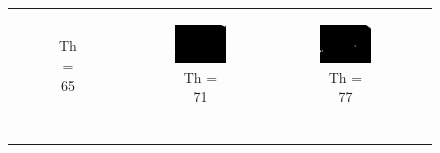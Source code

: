 \begin{figure}[htbp]
\begin{tabular}{cccc}
\begin{subfigure}{0.2\linewidth}
    \caption{Th = 65}
    \end{subfigure} &
    \begin{subfigure}{0.2\linewidth}
    \centering
    \includegraphics[width=\linewidth]{plots/thresholding/th2}
    \caption{Th = 71}
    \end{subfigure} &
    \begin{subfigure}{0.2\linewidth}
    \centering
    \includegraphics[width=\linewidth]{plots/thresholding/th3}
    \caption{Th = 77}
    \end{subfigure} \\
    \begin{subfigure}{0.2\linewidth}
    \centering

\end{subfigure}
\end{tabular}
\end{figure}
